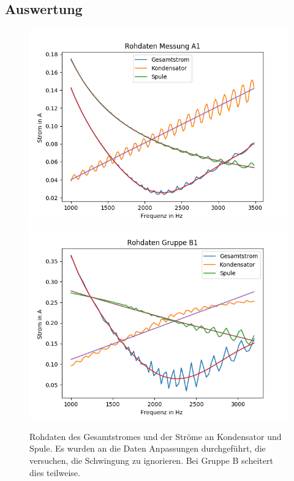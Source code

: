 \documentclass[12pt,a4paper]{article}
\begin{document}
\subsection{Auswertung}
\begin{figure}
\centering
\includegraphics[scale=1]{Bilder/Parallel_Rohdaten.png}
\includegraphics[scale=1]{Bilder/Parallel_RohdatenB.png}
\caption{Rohdaten des Gesamtstromes und der Ströme an Kondensator und Spule. Es wurden an die Daten Anpassungen durchgeführt, die versuchen, die Schwingung zu ignorieren. Bei Gruppe B scheitert dies teilweise.}
\label{fig:parallel_Rohdaten}
\end{figure}
\end{document}
